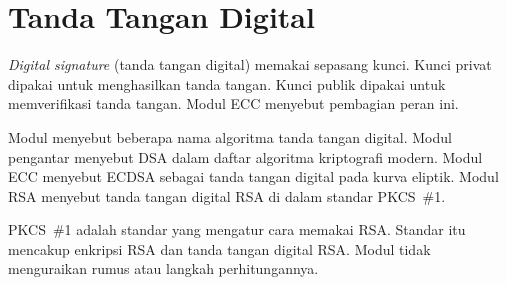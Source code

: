 \section{Tanda Tangan Digital}

\textit{Digital signature} (tanda tangan digital) memakai sepasang kunci.
Kunci privat dipakai untuk menghasilkan tanda tangan. Kunci publik dipakai
untuk memverifikasi tanda tangan. Modul ECC menyebut pembagian peran ini.

Modul menyebut beberapa nama algoritma tanda tangan digital. Modul pengantar
menyebut DSA dalam daftar algoritma kriptografi modern. Modul ECC menyebut
ECDSA sebagai tanda tangan digital pada kurva eliptik. Modul RSA menyebut
tanda tangan digital RSA di dalam standar PKCS~\#1.

PKCS~\#1 adalah standar yang mengatur cara memakai RSA. Standar itu mencakup
enkripsi RSA dan tanda tangan digital RSA. Modul tidak menguraikan rumus atau
langkah perhitungannya.
